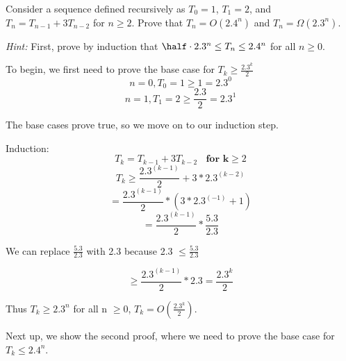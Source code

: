 \documentclass{article}
\begin{document}
\setcounter{equation}{0}
\begin{problem}
Consider a sequence defined recursively as
$T_0 = 1$, $T_1 = 2$, and $T_n = T_{n-1}+3T_{n-2}$ for
$n\ge 2$. Prove that $T_n = O(2.4^n)$ and $T_n = \Omega(2.3^n)$.

\smallskip
\noindent
\emph{Hint:} 
First, prove by induction that $\half\cdot 2.3^n \le T_n \le 2.4^n$ for all $n\ge 0$.
\end{problem}

\begin{solution}
\begin{description}

To begin, we first need to prove the base case for $T_k \ge \frac{2.3^k}{2}$
\begin{equation}
    n = 0, T_0 = 1 \ge 1 = 2.3^0
\end{equation}
\begin{equation}
    n = 1, T_1 = 2 \ge \frac{2.3}{2} = 2.3^1
\end{equation}

The base cases prove true, so we move on to our induction step.

Induction:
\begin{equation}
T_k = T_{k-1} + 3T_{k-2} \> \> \> \> \textbf{for k} \ge 2
\end{equation}
\begin{equation}
T_k \ge \frac{2.3^{(k-1)}}{2} + 3 * 2.3^{(k-2)}
\end{equation}
\begin{equation}
= \frac{2.3^{(k-1)}}{2} * (3*2.3^{(-1)} + 1)
\end{equation}
\begin{equation}
= \frac{2.3^{(k-1)}}{2} * \frac{5.3}{2.3}
\end{equation}


We can replace $\frac{5.3}{2.3}$ with 2.3 because 2.3 $\le \frac{5.3}{2.3}$


\begin{equation}
\ge \frac{2.3^{(k-1)}}{2} * 2.3 = \frac{2.3^k}{2}
\end{equation}
\begin{description}
Thus $T_k \ge 2.3^n$ for all n $\ge 0$, $T_k = O(\frac{2.3^k}{2})$.
\end{description}

Next up, we show the second proof, where we need to prove the base case for $T_k \le 2.4^n$.


\end{description}
\end{solution}
\end{document}
